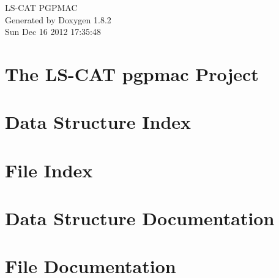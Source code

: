\documentclass{book}
\begin{document}
\hypersetup{pageanchor=false,citecolor=blue}
\begin{titlepage}
\vspace*{7cm}
\begin{center}
{\Large L\-S-\/\-C\-A\-T P\-G\-P\-M\-A\-C }\\
\vspace*{1cm}
{\large Generated by Doxygen 1.8.2}\\
\vspace*{0.5cm}
{\small Sun Dec 16 2012 17:35:48}\\
\end{center}
\end{titlepage}
\clearemptydoublepage
{}
\tableofcontents
\clearemptydoublepage
{}
\hypersetup{pageanchor=true,citecolor=blue}
\chapter{The L\-S-\/\-C\-A\-T pgpmac Project}
\label{index}\hypertarget{index}{}
\chapter{Data Structure Index}

\chapter{File Index}

\chapter{Data Structure Documentation}

















\chapter{File Documentation}










\printindex
\end{document}
